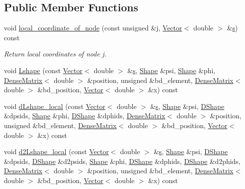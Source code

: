 \subsection*{Public Member Functions}
\begin{DoxyCompactItemize}
\item 
void \hyperlink{classoomph_1_1GeometricTElement_3_012_01_4_aeabbac1b1c1fe3019eee0040f162990e}{local\+\_\+coordinate\+\_\+of\+\_\+node} (const unsigned \&j, \hyperlink{classoomph_1_1Vector}{Vector}$<$ double $>$ \&\hyperlink{cfortran_8h_ab7123126e4885ef647dd9c6e3807a21c}{s}) const
\begin{DoxyCompactList}\small\item\em Return local coordinates of node j. \end{DoxyCompactList}\item 
void \hyperlink{classoomph_1_1GeometricTElement_3_012_01_4_a8e6bab8c2bd951889894b3a08b796207}{Lshape} (const \hyperlink{classoomph_1_1Vector}{Vector}$<$ double $>$ \&\hyperlink{cfortran_8h_ab7123126e4885ef647dd9c6e3807a21c}{s}, \hyperlink{classoomph_1_1Shape}{Shape} \&psi, \hyperlink{classoomph_1_1Shape}{Shape} \&phi, \hyperlink{classoomph_1_1DenseMatrix}{Dense\+Matrix}$<$ double $>$ \&position, unsigned \&bd\+\_\+element, \hyperlink{classoomph_1_1DenseMatrix}{Dense\+Matrix}$<$ double $>$ \&bd\+\_\+position, \hyperlink{classoomph_1_1Vector}{Vector}$<$ double $>$ \&x) const
\item 
void \hyperlink{classoomph_1_1GeometricTElement_3_012_01_4_a3ab2648ee1e98ad31c5246a8bd189556}{d\+Lshape\+\_\+local} (const \hyperlink{classoomph_1_1Vector}{Vector}$<$ double $>$ \&\hyperlink{cfortran_8h_ab7123126e4885ef647dd9c6e3807a21c}{s}, \hyperlink{classoomph_1_1Shape}{Shape} \&psi, \hyperlink{classoomph_1_1DShape}{D\+Shape} \&dpsids, \hyperlink{classoomph_1_1Shape}{Shape} \&phi, \hyperlink{classoomph_1_1DShape}{D\+Shape} \&dphids, \hyperlink{classoomph_1_1DenseMatrix}{Dense\+Matrix}$<$ double $>$ \&position, unsigned \&bd\+\_\+element, \hyperlink{classoomph_1_1DenseMatrix}{Dense\+Matrix}$<$ double $>$ \&bd\+\_\+position, \hyperlink{classoomph_1_1Vector}{Vector}$<$ double $>$ \&x) const
\item 
void \hyperlink{classoomph_1_1GeometricTElement_3_012_01_4_ab842b93f817d9b14c133d555bec8c373}{d2\+Lshape\+\_\+local} (const \hyperlink{classoomph_1_1Vector}{Vector}$<$ double $>$ \&\hyperlink{cfortran_8h_ab7123126e4885ef647dd9c6e3807a21c}{s}, \hyperlink{classoomph_1_1Shape}{Shape} \&psi, \hyperlink{classoomph_1_1DShape}{D\+Shape} \&dpsids, \hyperlink{classoomph_1_1DShape}{D\+Shape} \&d2psids, \hyperlink{classoomph_1_1Shape}{Shape} \&phi, \hyperlink{classoomph_1_1DShape}{D\+Shape} \&dphids, \hyperlink{classoomph_1_1DShape}{D\+Shape} \&d2phids, \hyperlink{classoomph_1_1DenseMatrix}{Dense\+Matrix}$<$ double $>$ \&position, unsigned \&bd\+\_\+element, \hyperlink{classoomph_1_1DenseMatrix}{Dense\+Matrix}$<$ double $>$ \&bd\+\_\+position, \hyperlink{classoomph_1_1Vector}{Vector}$<$ double $>$ \&x) const
\end{DoxyCompactItemize}


